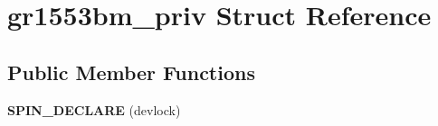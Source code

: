 \hypertarget{structgr1553bm__priv}{}\section{gr1553bm\+\_\+priv Struct Reference}
\label{structgr1553bm__priv}
\subsection*{Public Member Functions}
\begin{DoxyCompactItemize}
\item 
\mbox{\label{structgr1553bm__priv_a14663279e5935006eb9af624d1f9fbf9}} 
{\bfseries S\+P\+I\+N\+\_\+\+D\+E\+C\+L\+A\+RE} (devlock)
\end{DoxyCompactItemize}
